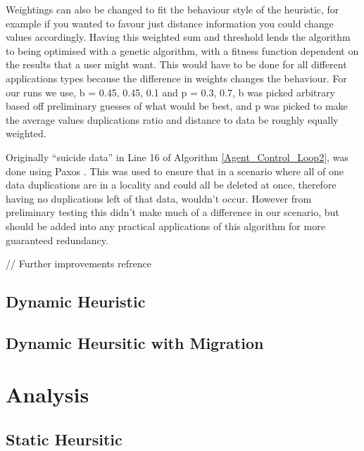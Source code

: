 \documentclass{UoYCSproject}
\begin{document}
Weightings can also be changed to fit the behaviour style of the heuristic, for example if you wanted to favour just distance information you could change values accordingly. 
Having this weighted sum and threshold lends the algorithm to being optimised with a genetic algorithm, with a fitness function dependent on the results that a user might want. 
This would have to be done for all different applications types because the difference in weights changes the behaviour. 
For our runs we use, b = {0.45, 0.45, 0.1} and p = {0.3, 0.7}, b was picked arbitrary based off preliminary guesses of what would be best, and p was picked to make the average values duplications ratio and distance to data be roughly equally weighted.

Originally “suicide data” in Line 16 of Algorithm \ref{Agent_Control_Loop2}, was done using Paxos \cite{Paxos}. 
This was used to ensure that in a scenario where all of one data duplications are in a locality and could all be deleted at once, therefore having no duplications left of that data, wouldn’t occur. 
However from preliminary testing this didn’t make much of a difference in our scenario, but should be added into any practical applications of this algorithm for more guaranteed redundancy. 

// Further improvements refrence


\section{Dynamic Heuristic}
\label{sec:Simple3}


\section{Dynamic Heursitic with Migration}
\label{sec:Simple4}



\chapter{Analysis}
\label{cha:Analysis}


\section{Static Heursitic}
\label{sec:Simple2a}
\end{document}
